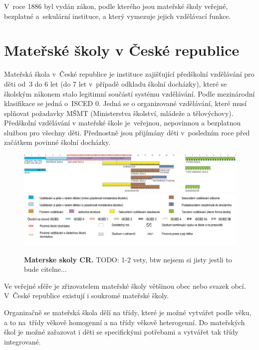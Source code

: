 		V roce 1886 byl vydán zákon, podle kterého jsou mateřské školy veřejné, bezplatné a sekulární instituce, a který vymezuje jejich vzdělávací funkce.



	\section{Mateřské školy v České republice}
		Mateřská škola v České republice je instituce zajišťující předškolní vzdělávání pro děti od 3 do 6 let (do 7 let v případě odkladu školní docházky), které se školským zákonem stalo legitimní součástí systému vzdělávání. Podle mezinárodní klasifikace se jedná o ISCED 0. Jedná se o organizované vzdělávání, které musí splňovat požadavky MŠMT (Ministerstva školství, mládeže a tělovýchovy). Předškolní vzdělávání v mateřské škole je veřejnou, nepovinnou a bezplatnou službou pro všechny děti. Přednostně jsou přijímány děti v posledním roce před začátkem povinné školní docházky. 

		\begin{figure}
			\includegraphics[width=1.0\linewidth]{fotky/msCR.png} \\
			\includegraphics[width=1.0\linewidth]{fotky/msVysvetlivky.png}
			\caption{ \textbf{Materske skoly CR.}
				TODO: 1-2 vety, btw nejsem si jisty jestli to bude citelne...
			}
			\label{obr:msCR}
		\end{figure}

		Ve veřejné sféře je zřizovatelem mateřské školy většinou obec nebo svazek obcí. V České republice existují i soukromé mateřské školy.

		Organizačně se mateřská škola dělí na třídy, které je možné vytvářet podle věku, a to na třídy věkově homogenní a na třídy věkově heterogenní. Do mateřských škol je možné zařazovat i děti se specifickými potřebami a vytvářet tak třídy integrované. 

